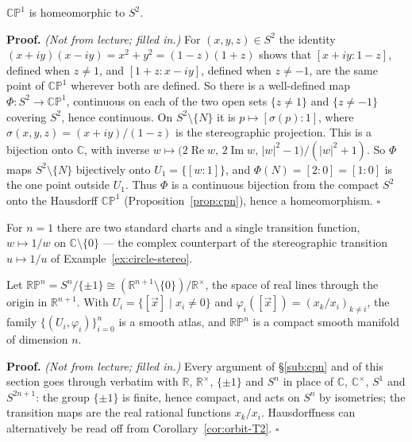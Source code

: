 \documentclass[11pt]{report}
\makeatletter
\newcounter{thmcounter}[section]
\renewenvironment{proof}[1][Proof]{\noindent\textbf{#1.} }{\hfill$\square$\par\vspace{5pt}}
\newcommand{\thmlabel}[1]{\edef\@currentlabel{\arabic{section}.\arabic{thmcounter}}\label{#1}}
\newcommand{\leeref}[1]{\par\smallskip{\raggedleft\footnotesize\textsc{Lee}:\ #1\par}}
\makeatother
\begin{document}
\begin{propbox}\thmlabel{prop:cp1-sphere}
$\mathbb{CP}^1$ is homeomorphic to $S^2$.
\leeref{Problem 4-5(b)}
\end{propbox}

\begin{proof}
\textit{(Not from lecture; filled in.)} For $(x,y,z) \in S^2$ the identity $(x+iy)(x-iy) = x^2 + y^2 = (1-z)(1+z)$ shows that $[x+iy : 1-z]$, defined when $z \ne 1$, and $[1+z : x-iy]$, defined when $z \ne -1$, are the same point of $\mathbb{CP}^1$ wherever both are defined. So there is a well-defined map $\Phi : S^2 \to \mathbb{CP}^1$, continuous on each of the two open sets $\{z \ne 1\}$ and $\{z \ne -1\}$ covering $S^2$, hence continuous. On $S^2 \setminus \{N\}$ it is $p \mapsto [\sigma(p) : 1]$, where $\sigma(x,y,z) = (x+iy)/(1-z)$ is the stereographic projection. This is a bijection onto $\mathbb{C}$, with inverse $w \mapsto \big(2\operatorname{Re} w,\, 2\operatorname{Im} w,\, |w|^2 - 1\big)/(|w|^2+1)$. So $\Phi$ maps $S^2 \setminus \{N\}$ bijectively onto $U_1 = \{[w : 1]\}$, and $\Phi(N) = [2 : 0] = [1:0]$ is the one point outside $U_1$. Thus $\Phi$ is a continuous bijection from the compact $S^2$ onto the Hausdorff $\mathbb{CP}^1$ (Proposition~\ref{prop:cpn}), hence a homeomorphism.
\end{proof}

\begin{rembox}\label{rem:smooth-structures-6}
For $n = 1$ there are two standard charts and a single transition function, $w \mapsto 1/w$ on $\mathbb{C} \setminus \{0\}$ --- the complex counterpart of the stereographic transition $u \mapsto 1/u$ of Example~\ref{ex:circle-stereo}.
\end{rembox}

\begin{corbox}\thmlabel{cor:rpn-atlas}
Let $\mathbb{RP}^n = S^n/\{\pm 1\} \cong (\mathbb{R}^{n+1}\setminus\{0\})/\mathbb{R}^\times$, the space of real lines through the origin in $\mathbb{R}^{n+1}$. With $U_i = \{[\vec x] \mid x_i \neq 0\}$ and $\varphi_i([\vec x]) = (x_k/x_i)_{k \neq i}$, the family $\{(U_i, \varphi_i)\}_{i=0}^n$ is a smooth atlas, and $\mathbb{RP}^n$ is a compact smooth manifold of dimension $n$.
\leeref{Example 1.33}
\end{corbox}

\begin{proof}
\textit{(Not from lecture; filled in.)} Every argument of \S\ref{sub:cpn} and of this section goes through verbatim with $\mathbb{R}$, $\mathbb{R}^\times$, $\{\pm1\}$ and $S^n$ in place of $\mathbb{C}$, $\mathbb{C}^\times$, $S^1$ and $S^{2n+1}$: the group $\{\pm 1\}$ is finite, hence compact, and acts on $S^n$ by isometries; the transition maps are the real rational functions $x_k/x_i$. Hausdorffness can alternatively be read off from Corollary~\ref{cor:orbit-T2}.
\end{proof}
\end{document}
